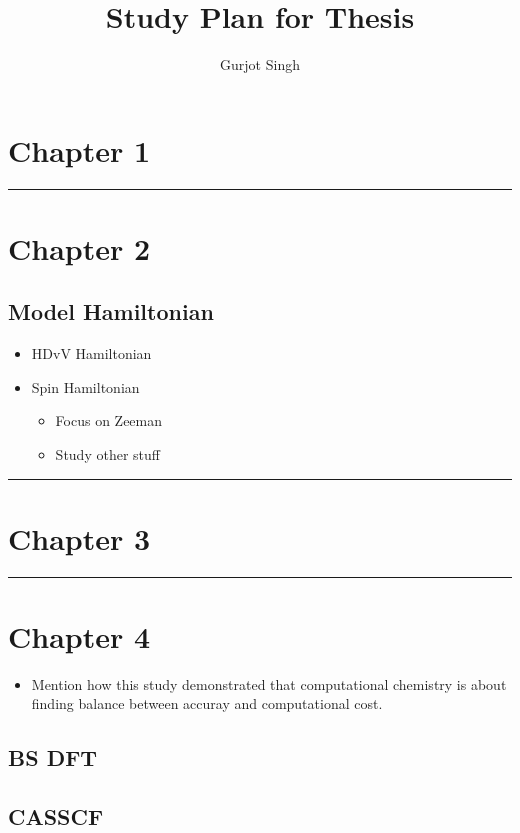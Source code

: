 \documentclass{article}
\title{Study Plan for Thesis}
\author{Gurjot Singh}
\newcommand*\sepline
{
  \begin{center}
    \rule[1ex]{.5\textwidth}{.5pt}
  \end{center}
}
\begin{document}
\maketitle

\section{Chapter 1}

\sepline

\section{Chapter 2}

\subsection{Model Hamiltonian}

\begin{itemize}
    \item HDvV Hamiltonian
    \item Spin Hamiltonian
    \begin{itemize}
        \item Focus on Zeeman
        \item Study other stuff
    \end{itemize}
\end{itemize}

\sepline

\section{Chapter 3}

\sepline

\section{Chapter 4}

\begin{itemize}
    \item Mention how this study demonstrated that computational chemistry is about finding balance between accuray and computational cost.
\end{itemize}

\subsection{BS DFT}

\subsection{CASSCF}
\end{document}
